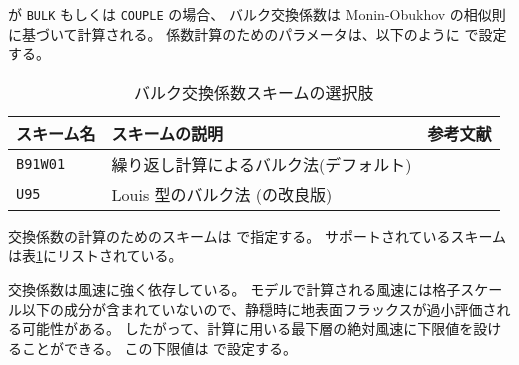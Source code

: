  が \verb|BULK| もしくは \verb|COUPLE| の場合、
バルク交換係数は Monin-Obukhov の相似則に基づいて計算される。
係数計算のためのパラメータは、以下のように  で設定する。
%

\begin{table}[h]
\begin{center}
  \caption{バルク交換係数スキームの選択肢}
  \label{tab:nml_bulk}
  \begin{tabularx}{150mm}{llX} \hline
    \rowcolor[gray]{0.9}  スキーム名 & スキームの説明 & 参考文献 \\ \hline
      \verb|B91W01| & 繰り返し計算によるバルク法(デフォルト) & \citet{beljaars_1991,wilson_2001} \\
      \verb|U95|    & Louis 型のバルク法 (\citet{louis_1979}の改良版) & \citet{uno_1995} \\
    \hline
  \end{tabularx}
\end{center}
\end{table}

交換係数の計算のためのスキームは  で指定する。
サポートされているスキームは表\ref{tab:nml_bulk}にリストされている。

交換係数は風速に強く依存している。
モデルで計算される風速には格子スケール以下の成分が含まれていないので、静穏時に地表面フラックスが過小評価される可能性がある。
したがって、計算に用いる最下層の絶対風速に下限値を設けることができる。
この下限値は  で設定する。


